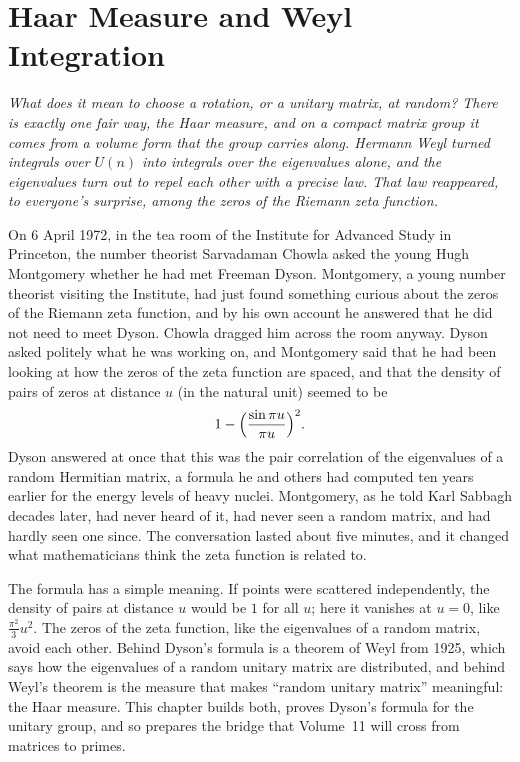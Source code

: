 \chapter{Haar Measure and Weyl Integration}

\begin{center}\itshape
What does it mean to choose a rotation, or a unitary matrix, at random? There is exactly one fair way, the Haar measure, and on a compact matrix group it
comes from a volume form that the group carries along. Hermann Weyl turned integrals over $U(n)$ into integrals over the eigenvalues alone, and the
eigenvalues turn out to repel each other with a precise law. That law reappeared, to everyone's surprise, among the zeros of the Riemann zeta function.
\end{center}

On 6 April 1972, in the tea room of the Institute for Advanced Study in Princeton, the number theorist Sarvadaman Chowla asked the young Hugh Montgomery
whether he had met Freeman Dyson. Montgomery, a young number theorist visiting the Institute, had just found something curious about the zeros of the
Riemann zeta function, and by his own account he answered that he did not need to meet Dyson. Chowla dragged him across the
room anyway. Dyson asked politely what he was working on, and Montgomery said that he had been looking at how the zeros of the zeta function are
spaced, and that the density of pairs of zeros at distance $u$ (in the natural unit) seemed to be
\[1-\Bigl(\frac{\sin\pi u}{\pi u}\Bigr)^2.\]
Dyson answered at once that this was the pair correlation of the eigenvalues of a random Hermitian matrix, a formula he and others had computed ten
years earlier for the energy levels of heavy nuclei. Montgomery, as he told Karl Sabbagh decades later, had never heard of it, had never seen a random matrix,
and had hardly seen one since. The conversation lasted about five minutes, and it changed what mathematicians think the zeta function is related to.

The formula has a simple meaning. If points were scattered independently, the density of pairs at distance $u$ would be $1$ for all $u$; here it vanishes
at $u=0$, like $\frac{\pi^2}3u^2$. The zeros of the zeta function, like the eigenvalues of a random matrix, avoid each other. Behind Dyson's formula is a
theorem of Weyl from 1925, which says how the eigenvalues of a random unitary matrix are distributed, and behind Weyl's theorem is the measure that
makes ``random unitary matrix'' meaningful: the Haar measure. This chapter builds both, proves Dyson's formula for the unitary group, and so prepares the
bridge that Volume~11 will cross from matrices to primes.

